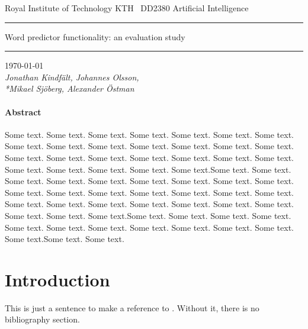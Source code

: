 \documentclass[a4paper, 11pt]{article}
\begin{document}
\begin{titlepage}
\begin{center}
{\Huge \noindent Royal Institute of Technology KTH}
\vspace{15pt}\ 
{\huge \noindent DD2380 Artificial Intelligence}
\vspace{3cm}
\hrule
\vspace{15pt}
{\Huge Word predictor functionality: an evaluation study}
\vspace{15pt}
\hrule
\vspace{1cm}
{\Large\today\\}
\vspace{1em}
{\slshape Jonathan Kindfält, Johannes Olsson,
\\*Mikael Sjöberg, Alexander Östman}
\end{center}
\vspace{1cm}
\paragraph{Abstract}
Some text. Some text. Some text. Some text. Some text. Some text. Some text. Some text. Some text. Some text. Some text. Some text. Some text. Some text. Some text. Some text. Some text. Some text. Some text. Some text. Some text. Some text. Some text. Some text. Some text. Some text.Some text. Some text. Some text. Some text. Some text. Some text. Some text. Some text. Some text. Some text. Some text. Some text. Some text. Some text. Some text. Some text. Some text. Some text. Some text. Some text. Some text. Some text. Some text. Some text. Some text. Some text.Some text. Some text. Some text. Some text. Some text. Some text. Some text. Some text. Some text. Some text. Some text. Some text.Some text. Some text.

\end{titlepage}

\section{Introduction}
This is just a sentence to make a reference to \cite{frey}. Without it, there is no bibliography section.



\end{document}
